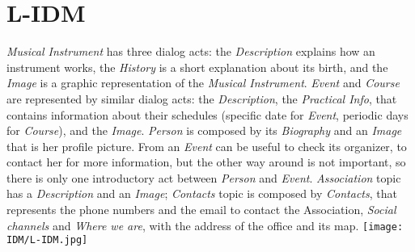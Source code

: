 \documentclass[../../DD.tex]{subfiles}
\begin{document}
\section{L-IDM \label{sect:2.1}}
	\textit{Musical Instrument} has three dialog acts: the \textit{Description} explains how an instrument works, the \textit{History} is a short explanation about its birth, and the \textit{Image} is a graphic representation of the \textit{Musical Instrument}.
	\textit{Event} and \textit{Course} are represented by similar dialog acts: the \textit{Description}, the \textit{Practical Info}, that contains information about their schedules (specific date for \textit{Event}, periodic days for \textit{Course}), and the \textit{Image}.
	\newline
	\textit{Person} is composed by its \textit{Biography} and an \textit{Image} that is her profile picture. From an \textit{Event} can be useful to check its organizer, to contact her for more information, but the other way around is not important, so there is only one introductory act between \textit{Person} and \textit{Event}.
	\newline
	\textit{Association} topic has a \textit{Description} and an \textit{Image}; \textit{Contacts} topic is composed by \textit{Contacts}, that represents the phone numbers and the email to contact the Association, \textit{Social channels} and \textit{Where we are}, with the address of the office and its map.
	\newline
	\texttt{[image: IDM/L-IDM.jpg]}
\end{document}
